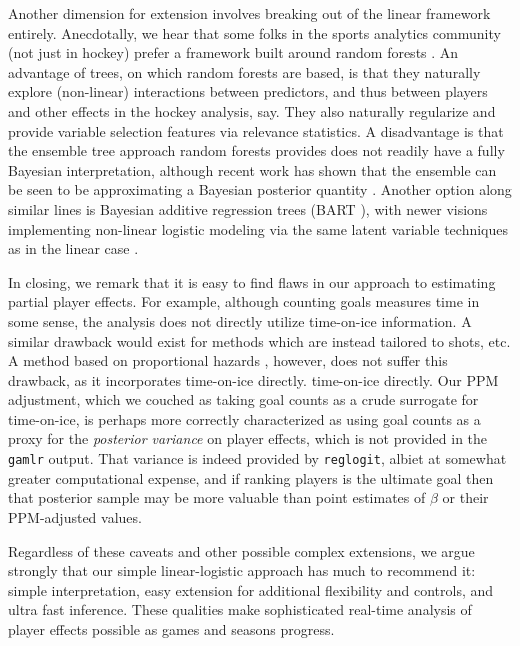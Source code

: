 Another dimension for extension involves breaking out of the linear framework
entirely.  Anecdotally, we hear that some folks in the sports analytics
community (not just in hockey) prefer a framework built around random forests
\cite{breiman:2001}.  An advantage of trees, on which random forests are based,
is that they naturally explore (non-linear) interactions between predictors,
and thus between players and other effects in the hockey analysis, say.  They
also naturally regularize and provide variable selection features via
relevance statistics. A disadvantage is that the ensemble tree approach random
forests provides does not readily have a fully Bayesian interpretation,
although recent work has shown that the ensemble can be seen to be
approximating a Bayesian posterior quantity \cite{taddy:eta:2015}.  Another
option along similar lines is Bayesian additive regression trees (BART
\cite{ChipGeorMcCu2010}), with newer visions implementing non-linear logistic
modeling via the same latent variable techniques as in the linear case
\cite{gra:pols:2012}.

In closing, we remark that it is easy to find flaws in our approach to
estimating partial player effects.  For example, although counting goals
measures time in some sense, the analysis does not directly utilize
time-on-ice information.  A similar drawback would exist for methods which are
instead tailored to shots, etc.  A method based on proportional hazards
\cite{ThoVenJen12}, however, does not suffer this drawback, as it incorporates
time-on-ice directly.  time-on-ice directly.  Our PPM adjustment, which we
couched as taking goal counts as a crude surrogate for time-on-ice, is perhaps
more correctly characterized as using goal counts as a proxy for the {\em
posterior variance} on player effects, which is not provided in the {\tt
gamlr} output.  That variance is indeed provided by {\tt reglogit}, albiet at
somewhat greater computational expense, and if ranking players is the ultimate
goal then that posterior sample may be more valuable than point estimates of
$\beta$ or their PPM-adjusted values.

Regardless of these caveats and other possible complex extensions, we argue
strongly that our simple linear-logistic approach has much to recommend it:
simple interpretation, easy extension for additional flexibility and controls,
and ultra fast inference.  These qualities make sophisticated real-time
analysis of player effects possible as games and seasons progress.


